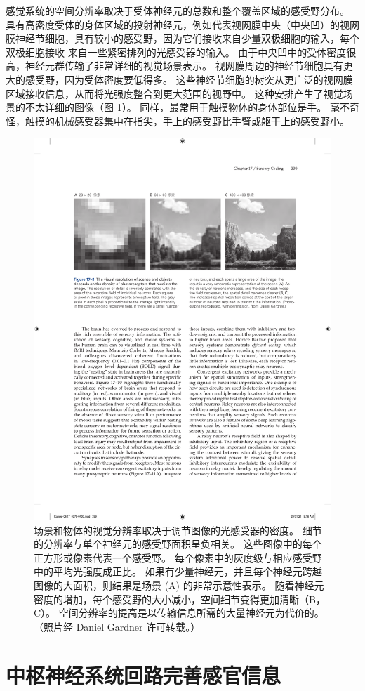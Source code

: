 感觉系统的空间分辨率取决于受体神经元的总数和整个覆盖区域的感受野分布。 
具有高密度受体的身体区域的投射神经元，例如代表视网膜中央（中央凹）的视网膜神经节细胞，具有较小的感受野，因为它们接收来自少量双极细胞的输入，每个双极细胞接收 来自一些紧密排列的光感受器的输入。 
由于中央凹中的受体密度很高，神经元群传输了非常详细的视觉场景表示。 
视网膜周边的神经节细胞具有更大的感受野，因为受体密度要低得多。 
这些神经节细胞的树突从更广泛的视网膜区域接收信息，从而将光强度整合到更大范围的视野中。 
这种安排产生了视觉场景的不太详细的图像（图 \ref{fig:17_9}）。 
同样，最常用于触摸物体的身体部位是手。 
毫不奇怪，触摸的机械感受器集中在指尖，手上的感受野比手臂或躯干上的感受野小。

\begin{figure}[htbp]
	\centering
	\includegraphics[width=0.7\linewidth]{chap17/fig_17_9}
	\caption{场景和物体的视觉分辨率取决于调节图像的光感受器的密度。 
		细节的分辨率与单个神经元的感受野面积呈负相关。 
		这些图像中的每个正方形或像素代表一个感受野。 
		每个像素中的灰度级与相应感受野中的平均光强度成正比。 
		如果有少量神经元，并且每个神经元跨越图像的大面积，则结果是场景 (A) 的非常示意性表示。 
		随着神经元密度的增加，每个感受野的大小减小，空间细节变得更加清晰（B，C）。
		空间分辨率的提高是以传输信息所需的大量神经元为代价的。 （照片经 Daniel Gardner 许可转载。）}
	\label{fig:17_9}
\end{figure}



\section{中枢神经系统回路完善感官信息}

